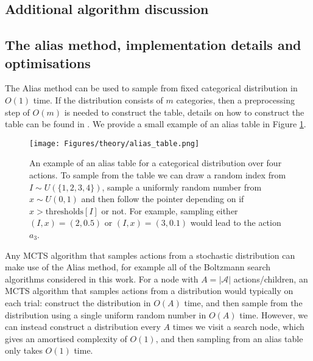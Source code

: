 \documentclass{article}
\newcommand{\cl}[1]{\mathcal{#1}}
\theoremstyle{plain}
\begin{document}
\begin{appendices}
        
        
        
        
        
        
        
        
        
        
        
        
  
\newpage      
\section{Additional algorithm discussion} \label{app:additional_algo_deets}
	\subsection{The alias method, implementation details and optimisations} \label{app:alias}

    \FloatBarrier
	
	
		The Alias method \cite{alias1,alias2} can be used to sample from fixed categorical distribution in $O(1)$ time. If the distribution consists of $m$ categories, then a preprocessing step of $O(m)$ is needed to construct the table, details on how to construct the table can be found in \cite{alias2}. We provide a small example of an alias table in Figure \ref{fig:alias}.
	
        
        \begin{figure}
            \centering
            \texttt{[image: Figures/theory/alias\_table.png]}
            \caption{An example of an alias table for a categorical distribution over four actions. To sample from the table we can draw a random index from $I\sim U(\{1,2,3,4\})$, sample a uniformly random number from $x\sim U(0,1)$ and then follow the pointer depending on if $x>\text{thresholds}[I]$ or not. For example, sampling either $(I,x)=(2,0.5)$  or $(I,x)=(3,0.1)$ would lead to the action $a_3$.}
            \label{fig:alias}
        \end{figure}
        
        
        Any MCTS algorithm that samples actions from a stochastic distribution can make use of the Alias method, for example all of the Boltzmann search algorithms considered in this work. For a node with $A=|\cl{A}|$ actions/children, an MCTS algorithm that samples actions from a distribution would typically on each trial: construct the distribution in $O(A)$ time, and then sample from the distribution using a single uniform random number in $O(A)$ time. However, we can instead construct a distribution every $A$ times we visit a search node, which gives an amortised complexity of $O(1)$, and then sampling from an alias table only takes $O(1)$ time.
        

\end{appendices}
\end{document}
